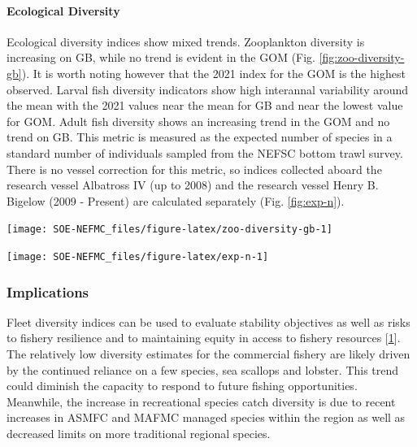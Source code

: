 \documentclass[
  10pt,
]{article}
\let\origfigure\figure
\let\endorigfigure\endfigure
\renewenvironment{figure}[1][2] {
    \expandafter\origfigure\expandafter[H]
} {
    \endorigfigure
}
\begin{document}
\hypertarget{ecological-diversity}{%
\paragraph{Ecological Diversity}\label{ecological-diversity}}

Ecological diversity indices show mixed trends. Zooplankton diversity is increasing on GB, while no trend is evident in the GOM (Fig. \ref{fig:zoo-diversity-gb}). It is worth noting however that the 2021 index for the GOM is the highest observed. Larval fish diversity indicators show high interannal variability around the mean with the 2021 values near the mean for GB and near the lowest value for GOM. Adult fish diversity shows an increasing trend in the GOM and no trend on GB. This metric is measured as the expected number of species in a standard number of individuals sampled from the NEFSC bottom trawl survey. There is no vessel correction for this metric, so indices collected aboard the research vessel Albatross IV (up to 2008) and the research vessel Henry B. Bigelow (2009 - Present) are calculated separately (Fig. \ref{fig:exp-n}).

\begin{figure}

{\centering \texttt{[image: SOE-NEFMC\_files/figure-latex/zoo-diversity-gb-1]} 

}

\caption{Zooplankton diversity on Georges Bank and in the Gulf of Maine, based on Shannon diversity index. 2020 surveys were incomplete due to COVID-19.}\label{fig:zoo-diversity-gb}
\end{figure}

\begin{figure}

{\centering \texttt{[image: SOE-NEFMC\_files/figure-latex/exp-n-1]} 

}

\caption{Adult fish diversity for Georges Bank and in the Gulf of Maine, based on expected number of species. Results from survey vessels Albatross and Bigelow are reported separately due to catchability differences.}\label{fig:exp-n}
\end{figure}

\hypertarget{implications-3}{%
\subsubsection{Implications}\label{implications-3}}

Fleet diversity indices can be used to evaluate stability objectives as well as risks to fishery resilience and to maintaining equity in access to fishery resources {[}\protect\hyperlink{ref-gaichas_implementing_2018}{1}{]}. The relatively low diversity estimates for the commercial fishery are likely driven by the continued reliance on a few species, sea scallops and lobster. This trend could diminish the capacity to respond to future fishing opportunities. Meanwhile, the increase in recreational species catch diversity is due to recent increases in ASMFC and MAFMC managed species within the region as well as decreased limits on more traditional regional species.
\end{document}
